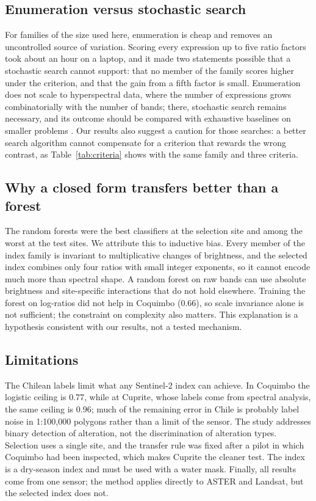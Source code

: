 \documentclass[preprint,authoryear,number]{elsarticle}
\begin{document}
\subsection{Enumeration versus stochastic search}

For families of the size used here, enumeration is cheap and removes an uncontrolled source of variation. Scoring every expression up to five ratio factors took about an hour on a laptop, and it made two statements possible that a stochastic search cannot support: that no member of the family scores higher under the criterion, and that the gain from a fifth factor is small. Enumeration does not scale to hyperspectral data, where the number of expressions grows combinatorially with the number of bands; there, stochastic search remains necessary, and its outcome should be compared with exhaustive baselines on smaller problems \citep{Bartlett2024,Kronberger2024}. Our results also suggest a caution for those searches: a better search algorithm cannot compensate for a criterion that rewards the wrong contrast, as Table~\ref{tab:criteria} shows with the same family and three criteria.

\subsection{Why a closed form transfers better than a forest}

The random forests were the best classifiers at the selection site and among the worst at the test sites. We attribute this to inductive bias. Every member of the index family is invariant to multiplicative changes of brightness, and the selected index combines only four ratios with small integer exponents, so it cannot encode much more than spectral shape. A random forest on raw bands can use absolute brightness and site-specific interactions that do not hold elsewhere. Training the forest on log-ratios did not help in Coquimbo (0.66), so scale invariance alone is not sufficient; the constraint on complexity also matters. This explanation is a hypothesis consistent with our results, not a tested mechanism.

\subsection{Limitations}

The Chilean labels limit what any Sentinel-2 index can achieve. In Coquimbo the logistic ceiling is 0.77, while at Cuprite, whose labels come from spectral analysis, the same ceiling is 0.96; much of the remaining error in Chile is probably label noise in 1:100{,}000 polygons rather than a limit of the sensor. The study addresses binary detection of alteration, not the discrimination of alteration types. Selection uses a single site, and the transfer rule was fixed after a pilot in which Coquimbo had been inspected, which makes Cuprite the cleaner test. The index is a dry-season index and must be used with a water mask. Finally, all results come from one sensor; the method applies directly to ASTER and Landsat, but the selected index does not.
\end{document}
